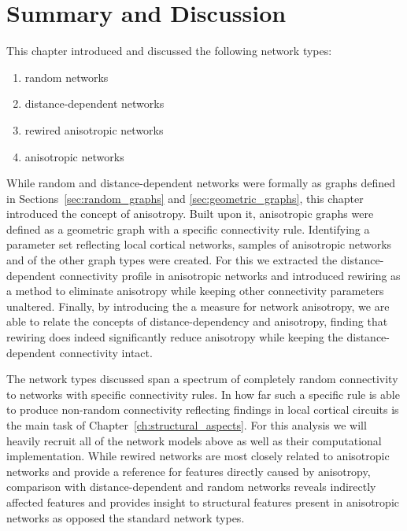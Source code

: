 

\section{Summary and Discussion}

This chapter introduced and discussed the following network types:
\begin{enumerate} 
  \itemsep-11pt
  \item random networks
  \item distance-dependent networks
  \item rewired anisotropic networks
  \item anisotropic networks
\end{enumerate}
While random and distance-dependent networks were formally as graphs
defined in Sections~\ref{sec:random_graphs} and
\ref{sec:geometric_graphs}, this chapter introduced the concept of
anisotropy. Built upon it, anisotropic graphs were defined as a
geometric graph with a specific connectivity rule. Identifying a
parameter set reflecting local cortical networks, samples of
anisotropic networks and of the other graph types were created. For
this we extracted the distance-dependent connectivity profile in
anisotropic networks and introduced rewiring as a method to eliminate
anisotropy while keeping other connectivity parameters unaltered.
Finally, by introducing the a measure for network anisotropy, we are
able to relate the concepts of distance-dependency and anisotropy,
finding that rewiring does indeed significantly reduce anisotropy
while keeping the distance-dependent connectivity intact.

The network types discussed span a spectrum of completely random
connectivity to networks with specific connectivity rules. In how far
such a specific rule is able to produce non-random connectivity
reflecting findings in local cortical circuits is the main task of
Chapter~\ref{ch:structural_aspects}. For this analysis we will heavily
recruit all of the network models above as well as their computational
implementation. While rewired networks are most closely related to
anisotropic networks and provide a reference for features directly
caused by anisotropy, comparison with distance-dependent and random
networks reveals indirectly affected features and provides insight to
structural features present in anisotropic networks as opposed the
standard network types.


